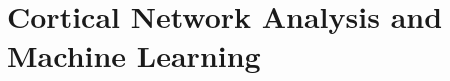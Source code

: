\documentclass[a4paper,11pt]{article}
\begin{document}




\section{Cortical Network Analysis and Machine Learning}\label{sec:data}
\end{document}
